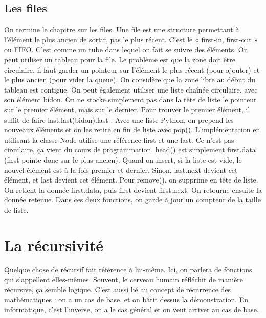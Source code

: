 \documentclass[10pt]{article}
\begin{document}
\subsection{Les files}
On termine le chapitre sur les files. Une file est une structure permettant à l'élément le plus ancien de sortir, pas le plus récent. C'est le « first-in, first-out » ou FIFO. C'est comme un tube dans lequel on fait se suivre des éléments.  
\newline \newline 
On peut utiliser un tableau pour la file. Le problème est que la zone doit être circulaire, il faut garder un pointeur sur l'élément le plus récent (pour ajouter) et le plus ancien (pour vider la queue). On considère que la zone libre au début du tableau est contigüe. 
\newline \newline 
On peut également utiliser une liste chaînée circulaire, avec son élément bidon. On ne stocke simplement pas dans la tête de liste le pointeur sur le premier élément, mais sur le dernier. Pour trouver le premier élément, il suffit de faire 
\newline
last.last(bidon).last .  
\newline \newline 
Avec une liste Python, on prepend les nouveaux éléments et on les retire en fin de liste avec pop(). 
\newline \newline 
L'implémentation en utilisant la classe Node utilise une référence first et une last. Ce n'est pas circulaire, ça vient du cours de programmation. head() est simplement first.data (first pointe donc sur le plus ancien). Quand on insert, si la liste est vide, le nouvel élément est à la fois premier et dernier. Sinon, last.next devient cet élément, et last devient cet élément. Pour remove(), on supprime en tête de liste. On retient la donnée first.data, puis first devient first.next. On retourne ensuite la donnée retenue. Dans ces deux fonctions, on garde à jour un compteur de la taille de liste.
\newpage
\section{La récursivité}
Quelque chose de récursif fait référence à lui-même. Ici, on parlera de fonctions qui s'appellent elles-mêmes. Souvent, le cerveau humain réfléchit de manière récursive, ça semble logique. C'est aussi lié au concept de récurrence des mathématiques : on a un cas de base, et on bâtit dessus la démonstration. En informatique, c'est l'inverse, on a le cas général et on veut arriver au cas de base.
\end{document}

